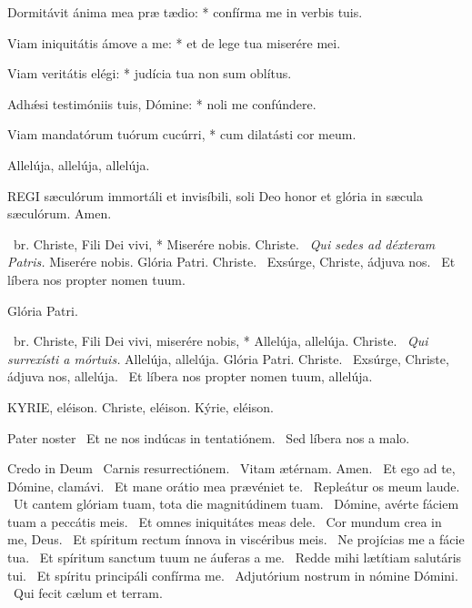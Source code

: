 Dormitávit ánima mea præ tædio: * confírma me in verbis tuis.

Viam iniquitátis ámove a me: * et de lege tua miserére mei.

Viam veritátis elégi: * judícia tua non sum oblítus.

Adhǽsi testimóniis tuis, Dómine: * noli me confúndere.

Viam mandatórum tuórum cucúrri, * cum dilatásti cor meum.



 Allelúja, allelúja, allelúja.


\lettrine[lines=2]{R}{EGI} sæculórum immortáli et invisíbili, soli Deo honor et glória in sæcula sæculórum. Amen.

\R\ br. Christe, Fili Dei vivi, * Miserére nobis. Christe. \V\ \textit{Qui sedes ad déxteram Patris.} Miserére nobis. Glória Patri. Christe. \V\ Exsúrge, Christe, ádjuva nos. \R\ Et líbera nos propter nomen tuum.

 Glória Patri.


\R\ br. Christe, Fili Dei vivi, miserére nobis, * Allelúja, allelúja. Christe. \V\ \textit{Qui surrexísti a mórtuis.} Allelúja, allelúja. Glória Patri. Christe. \V\ Exsúrge, Christe, ádjuva nos, allelúja. \R\ Et líbera nos propter nomen tuum, allelúja.


KYRIE, eléison. Christe, eléison. Kýrie, eléison.

Pater noster  \V\ Et ne nos indúcas in tentatiónem. \R\ Sed líbera nos a malo.

Credo in Deum  \V\ Carnis resurrectiónem. \R\ Vitam ætérnam. Amen. \V\ Et ego ad te, Dómine, clamávi. \R\ Et mane orátio mea prævéniet te. \V\ Repleátur os meum laude. \R\ Ut cantem glóriam tuam, tota die magnitúdinem tuam. \V\ Dómine, avérte fáciem tuam a peccátis meis. \R\ Et omnes iniquitátes meas dele. \V\ Cor mundum crea in me, Deus. \R\ Et spíritum rectum ínnova in viscéribus meis. \V\ Ne projícias me a fácie tua. \R\ Et spíritum sanctum tuum ne áuferas a me. \V\ Redde mihi lætítiam salutáris tui. \R\ Et spíritu principáli confírma me. \V\ Adjutórium nostrum in nómine Dómini. \R\ Qui fecit cælum et terram.

